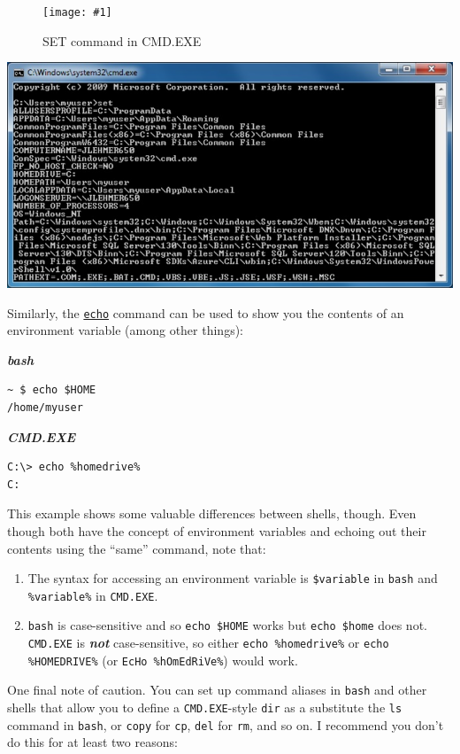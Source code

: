 \documentclass[10pt,]{book}
\numberwithin{figure}{chapter}
\DeclareRobustCommand{\fimg}[3]{
\ifxetex
\begin{figure}[H]
\texttt{[image: \#1]}
\caption{#2}
\label{fig:#3}
\end{figure}
\fi}
\begin{document}
\ifxetex\fimg{./images/set-cmd.png}{SET command in CMD.EXE}{set-command-in-cmd}
\else
\includegraphics{./images/set-cmd.png} \fi

Similarly, the \href{http://linux.die.net/man/1/echo}{\texttt{echo}}
command can be used to show you the contents of an environment variable
(among other things):

\textbf{\emph{bash}}

\begin{verbatim}
~ $ echo $HOME
/home/myuser
\end{verbatim}

\textbf{\emph{CMD.EXE}}

\begin{verbatim}
C:\> echo %homedrive%
C:
\end{verbatim}

This example shows some valuable differences between shells, though.
Even though both have the concept of environment variables and echoing
out their contents using the ``same'' command, note that:

\begin{enumerate}
\def\labelenumi{\arabic{enumi}.}
\item
  The syntax for accessing an environment variable is
  \texttt{\$variable} in \texttt{bash} and \texttt{\%variable\%} in
  \texttt{CMD.EXE}.
\item
  \texttt{bash} is case-sensitive and so \texttt{echo \$HOME} works but
  \texttt{echo \$home} does not. \texttt{CMD.EXE} is \textbf{\emph{not}}
  case-sensitive, so either \texttt{echo \%homedrive\%} or
  \texttt{echo \%HOMEDRIVE\%} (or \texttt{EcHo \%hOmEdRiVe\%}) would
  work.
\end{enumerate}

One final note of caution. You can set up command aliases in
\texttt{bash} and other shells that allow you to define a
\texttt{CMD.EXE}-style \texttt{dir} as a substitute the \texttt{ls}
command in \texttt{bash}, or \texttt{copy} for \texttt{cp}, \texttt{del}
for \texttt{rm}, and so on. I recommend you don't do this for at least
two reasons:
\end{document}
